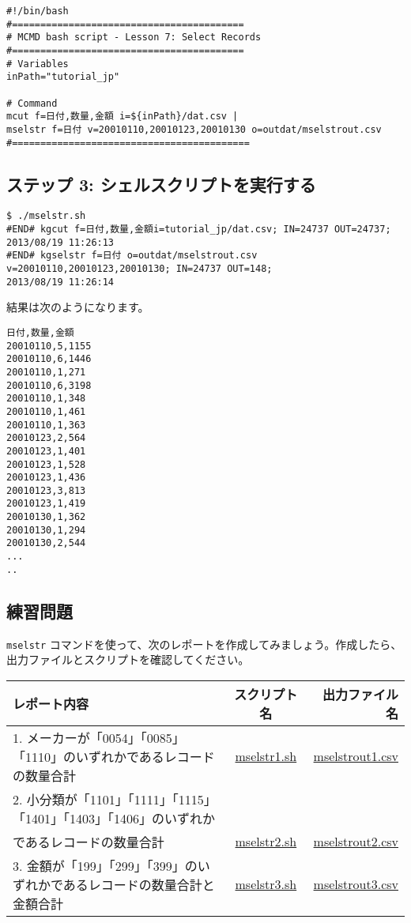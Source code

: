 \begin{verbatim}
#!/bin/bash
#=========================================
# MCMD bash script - Lesson 7: Select Records 
#=========================================
# Variables
inPath="tutorial_jp"

# Command 
mcut f=日付,数量,金額 i=${inPath}/dat.csv |
mselstr f=日付 v=20010110,20010123,20010130 o=outdat/mselstrout.csv
#==========================================
\end{verbatim}

\subsection{ステップ 3: シェルスクリプトを実行する}

\begin{verbatim}
$ ./mselstr.sh 
#END# kgcut f=日付,数量,金額i=tutorial_jp/dat.csv; IN=24737 OUT=24737; 2013/08/19 11:26:13
#END# kgselstr f=日付 o=outdat/mselstrout.csv v=20010110,20010123,20010130; IN=24737 OUT=148;
2013/08/19 11:26:14
\end{verbatim}

\noindent
結果は次のようになります。

\begin{verbatim}
日付,数量,金額
20010110,5,1155
20010110,6,1446
20010110,1,271
20010110,6,3198
20010110,1,348
20010110,1,461
20010110,1,363
20010123,2,564
20010123,1,401
20010123,1,528
20010123,1,436
20010123,3,813
20010123,1,419
20010130,1,362
20010130,1,294
20010130,2,544
...
..
\end{verbatim}

\subsection{練習問題}

\verb|mselstr| コマンドを使って、次のレポートを作成してみましょう。作成したら、出力ファイルとスクリプトを確認してください。

\begin{table}[htbp]
{\small
\begin{tabular}{ l | c || r }
\hline
\textbf{レポート内容}   & \textbf{スクリプト名} & \textbf{出力ファイル名}  \\
\hline
1. メーカーが「0054」「0085」「1110」のいずれかであるレコードの数量合計 & \href{exercise/mselstr1.sh}{mselstr1.sh} & \href{exercise/outdat/mselstrout1.csv}{mselstrout1.csv} \\
2. 小分類が「1101」「1111」「1115」「1401」「1403」「1406」のいずれか \\ であるレコードの数量合計 & \href{exercise/mselstr2.sh}{mselstr2.sh} & \href{exercise/outdat/mselstrout2.csv}{mselstrout2.csv} \\
3. 金額が「199」「299」「399」のいずれかであるレコードの数量合計と金額合計 & \href{exercise/mselstr3.sh}{mselstr3.sh} & \href{exercise/outdat/mselstrout3.csv}{mselstrout3.csv} \\

\hline
\end{tabular} 
}
\end{table} 

%
